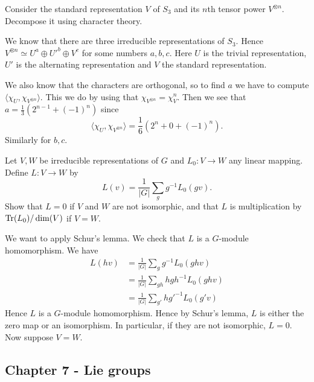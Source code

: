 \documentclass[11pt, english]{article}
\begin{document}
\begin{exc}[Exercise 2.7]
Consider the standard representation $V$ of $S_3$ and its $n$th tensor power $V^{\otimes n}$. Decompose it using character theory.  
\end{exc}
\begin{sol}
 We know that there are three irreducible representations of $S_3$. Hence $V^{\otimes n} \simeq U^a \oplus {U'}^{b} \oplus V^c$ for some numbers $a,b,c$. Here $U$ is the trivial representation, $U'$ is the alternating representation and $V$ the standard representation.

We also know that the characters are orthogonal, so to find $a$ we have to compute $\langle \chi_U, \chi_{V^{\otimes n}}\rangle $. This we do by using that $\chi_{V^{\otimes n}} = \chi_V^n$. Then we see that $a=\frac 13 (2^{n-1} + (-1)^n)$ since
$$
\langle \chi_U, \chi_{V^{\otimes n}} \rangle = \frac 16 \left( 2^n + 0 + (-1)^n \right).
$$
Similarly for $b,c$.
\end{sol}
 

\begin{exc}[Exercise 2.34]
Let $V,W$ be irreducible representations of $G$ and $L_0:V \to W$ any linear mapping. Define $L:V \to W$ by 
$$
L(v) = \frac{1}{\lvert G \rvert} \sum_g g^{-1} L_0(gv).
$$
Show that $L=0$ if $V$ and $W$ are not isomorphic, and that $L$ is multiplication by $\operatorname{Tr}(L_0)/\dim (V)$ if $V=W$.
\end{exc}
\begin{sol}
We want to apply Schur's lemma. We check that $L$ is a $G$-module homomorphism. We have
\begin{align*}
L(hv) &= \frac{1}{\lvert G \rvert} \sum_g g^{-1}L_0(ghv) \\
&= \frac{1}{\lvert G\rvert} \sum_{gh} h {gh}^{-1}L_0(ghv) \\
&= \frac{1}{\lvert G\rvert} \sum_{g'} h {g'}^{-1}L_0(g'v)
\end{align*}
Hence $L$ is a $G$-module homomorphism. Hence by Schur's lemma, $L$ is either the zero map or an isomorphism. In particular, if they are not isomorphic, $L=0$. Now suppose $V=W$. 
\end{sol}

\subsection{Chapter 7 - Lie groups}
\end{document}
